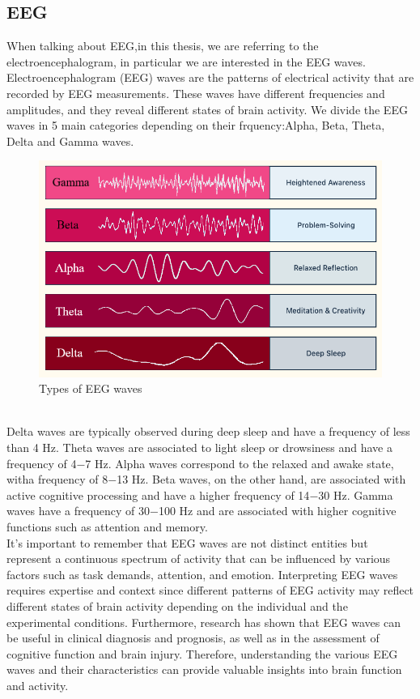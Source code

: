 \documentclass[a4paper]{sapthesis}
\begin{document}
\subsection{EEG}
When talking about EEG,in this thesis, we are referring to the
electroencephalogram, in particular we are interested in the 
EEG waves. Electroencephalogram (EEG) waves are the patterns 
of electrical activity that are recorded by EEG measurements. 
These waves have different frequencies and amplitudes, and they 
reveal different states of brain activity. We divide the EEG waves in 
5 main categories depending on their frquency:Alpha, Beta, Theta, 
Delta and Gamma waves.\begin{figure}[h]
  \includegraphics[scale=0.6]{waves}
  \centering
  \caption{Types of EEG waves}\label{fig:waves}
  
  \end{figure}\newline \\
Delta waves are typically observed during deep sleep and have a frequency
of less than 4 Hz. Theta waves are associated to light sleep or 
drowsiness and have a frequency of 4$-$7 Hz. Alpha waves correspond to the 
relaxed and awake state, witha frequency of 8$-$13 Hz. Beta waves, on the other 
hand, are associated with active cognitive processing and have a higher 
frequency of 14$-$30 Hz. Gamma waves have a frequency of 30$-$100 Hz and are associated with higher 
cognitive functions such as attention and memory.\newline \\
It's important to remember that EEG waves are not distinct entities but 
represent a continuous spectrum of activity that can be influenced by
various factors such as task demands, attention, and emotion. Interpreting EEG waves requires expertise 
and context since different patterns of EEG activity may reflect 
different states of brain activity depending on the individual and the 
experimental conditions. Furthermore, research has shown that EEG waves
can be useful in clinical diagnosis and prognosis, as well as in the
assessment of cognitive function and brain injury. Therefore, 
understanding the various EEG waves and their characteristics 
can provide valuable insights into brain function and activity.
\end{document}
